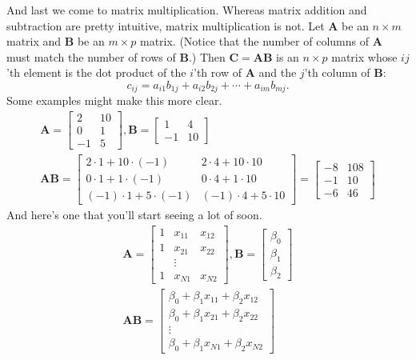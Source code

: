 \documentclass[12pt,oneside,openany]{book}
\begin{document}
And last we come to matrix multiplication. Whereas matrix addition and
subtraction are pretty intuitive, matrix multiplication is not. Let
\(\mathbf{A}\) be an \(n \times m\) matrix and \(\mathbf{B}\) be an
\(m \times p\) matrix. (Notice that the number of columns of
\(\mathbf{A}\) must match the number of rows of \(\mathbf{B}\).) Then
\(\mathbf{C} = \mathbf{A} \mathbf{B}\) is an \(n \times p\) matrix whose
\(ij\)'th element is the dot product of the \(i\)'th row of
\(\mathbf{A}\) and the \(j\)'th column of \(\mathbf{B}\): \[
c_{ij} = a_{i1} b_{1j} + a_{i2} b_{2j} + \cdots + a_{im} b_{mj}.
\] Some examples might make this more clear. \[
\begin{gathered}
\mathbf{A} = \begin{bmatrix}
  2 & 10 \\
  0 & 1 \\
  -1 & 5
\end{bmatrix},
\mathbf{B} = \begin{bmatrix}
  1 & 4 \\
  -1 & 10
\end{bmatrix} \\
\mathbf{A} \mathbf{B} = \begin{bmatrix}
  2 \cdot 1 + 10 \cdot (-1) & 2 \cdot 4 + 10 \cdot 10 \\
  0 \cdot 1 + 1 \cdot (-1) & 0 \cdot 4 + 1 \cdot 10 \\
  (-1) \cdot 1 + 5 \cdot (-1) & (-1) \cdot 4 + 5 \cdot 10
\end{bmatrix}
= \begin{bmatrix}
  -8 & 108 \\
  -1 & 10 \\
  -6 & 46
\end{bmatrix}
\end{gathered}
\] And here's one that you'll start seeing a lot of soon. \[
\begin{gathered}
\mathbf{A} = \begin{bmatrix}
  1 & x_{11} & x_{12} \\
  1 & x_{21} & x_{22} \\
  & \vdots \\
  1 & x_{N1} & x_{N2}
\end{bmatrix},
\mathbf{B} = \begin{bmatrix}
  \beta_0 \\
  \beta_1 \\
  \beta_2
\end{bmatrix} \\
\mathbf{A} \mathbf{B} = \begin{bmatrix}
  \beta_0 + \beta_1 x_{11} + \beta_2 x_{12} \\
  \beta_0 + \beta_1 x_{21} + \beta_2 x_{22} \\
  \vdots \\
  \beta_0 + \beta_1 x_{N1} + \beta_2 x_{N2}
\end{bmatrix}
\end{gathered}
\]
\end{document}
